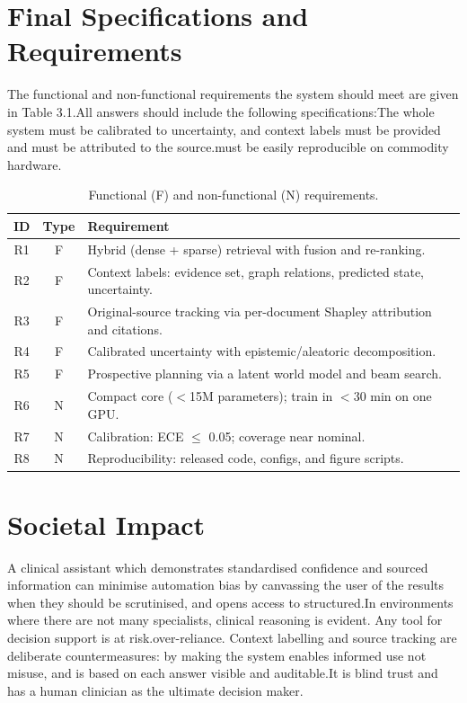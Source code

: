 \section{Final Specifications and Requirements}
The functional and non-functional requirements the system should meet are given in Table 3.1.All answers should include the following specifications:The whole system must be calibrated to uncertainty, and context labels must be provided and must be attributed to the source.must be easily reproducible on commodity hardware.

\begin{table}[H]
\centering
\caption{Functional (F) and non-functional (N) requirements.}
\label{tab:requirements}
\renewcommand{\arraystretch}{1.2}
\begin{tabular}{|c|c|p{10cm}|}
\hline
\textbf{ID} & \textbf{Type} & \textbf{Requirement} \\
\hline

R1 & F & Hybrid (dense + sparse) retrieval with fusion and re-ranking. \\
\hline

R2 & F & Context labels: evidence set, graph relations, predicted state, uncertainty. \\
\hline

R3 & F & Original-source tracking via per-document Shapley attribution and citations. \\
\hline

R4 & F & Calibrated uncertainty with epistemic/aleatoric decomposition. \\
\hline

R5 & F & Prospective planning via a latent world model and beam search. \\
\hline

R6 & N & Compact core ($<$15M parameters); train in $<$30 min on one GPU. \\
\hline

R7 & N & Calibration: ECE $\leq$ 0.05; coverage near nominal. \\
\hline

R8 & N & Reproducibility: released code, configs, and figure scripts. \\
\hline

\end{tabular}
\end{table}

\section{Societal Impact}
A clinical assistant which demonstrates standardised confidence and sourced information can minimise automation bias by canvassing the user of the results when they should be scrutinised, and opens access to structured.In environments where there are not many specialists, clinical reasoning is evident. Any tool for decision support is at risk.over-reliance. Context labelling and source tracking are deliberate countermeasures: by making the system enables informed use not misuse, and is based on each answer visible and auditable.It is blind trust and has a human clinician as the ultimate decision maker.


